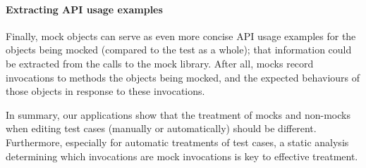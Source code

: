 \paragraph{Extracting API usage examples}
Finally, mock objects can serve as even more concise API usage
examples for the objects being mocked (compared to the test as a whole);
that information could be extracted from the calls to
the mock library. After all, mocks record invocations to methods the objects
being mocked, and the expected behaviours of those objects in response to
these invocations.

In summary, our applications show that the treatment of mocks and non-mocks
when editing test cases (manually or automatically) should be different.
Furthermore, especially for automatic treatments of test cases, a static
analysis determining which invocations are mock invocations is key to effective
treatment.

